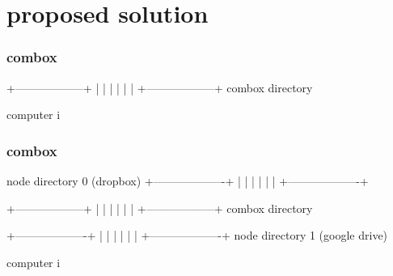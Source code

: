 
\section{proposed solution}

\begin{frame}[fragile]
  \frametitle{combox}

  {\tiny
  \begin{semiverbatim}










 +------------------+
 |                  |
 |                  |
 |                  |
 +------------------+
     combox directory










  computer i
  \end{semiverbatim}
  }

\end{frame}


\begin{frame}[fragile]
  \frametitle{combox}

  {\tiny
  \begin{semiverbatim}

         node directory 0
         (dropbox)
        +-------------------+
        |                   |
        |                   |
        |                   |
        +-------------------+


 +------------------+
 |                  |
 |                  |
 |                  |
 +------------------+
     combox directory


        +-------------------+
        |                   |
        |                   |
        |                   |
        +-------------------+
         node directory 1
         (google drive)

  computer i
  \end{semiverbatim}
  }

\end{frame}


